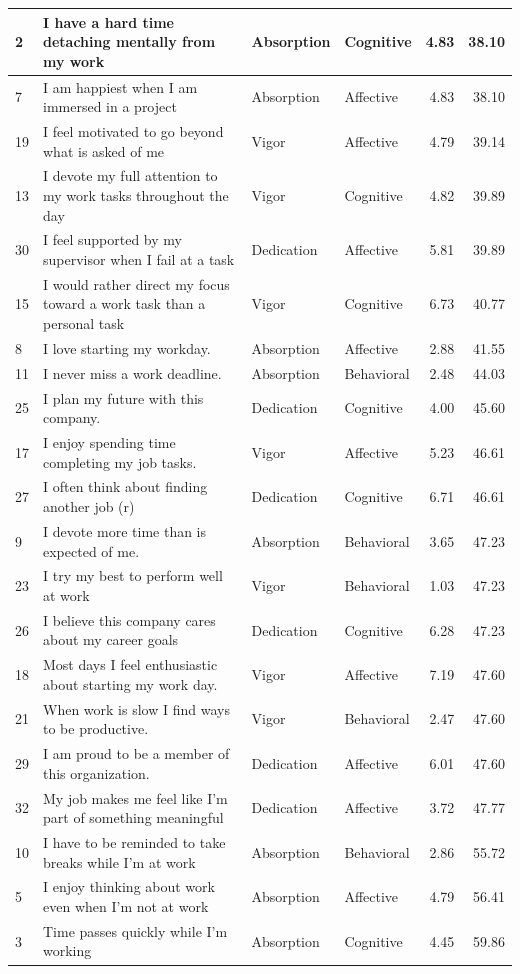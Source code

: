 \documentclass[
]{book}
\begin{document}
\begin{table}
\begin{tabular}[t]{l|l|l|l|r|r}
\hline
2 & I have a hard time detaching mentally from my work & Absorption & Cognitive & 4.83 & 38.10\\
\hline
7 & I am happiest when I am immersed in a project & Absorption & Affective & 4.83 & 38.10\\
\hline
19 & I feel motivated to go beyond what is asked of me & Vigor & Affective & 4.79 & 39.14\\
\hline
13 & I devote my full attention to my work tasks throughout the day & Vigor & Cognitive & 4.82 & 39.89\\
\hline
30 & I feel supported by my supervisor when I fail at a task & Dedication & Affective & 5.81 & 39.89\\
\hline
15 & I would rather direct my focus toward a work task than a personal task & Vigor & Cognitive & 6.73 & 40.77\\
\hline
8 & I love starting my workday. & Absorption & Affective & 2.88 & 41.55\\
\hline
11 & I never miss a work deadline. & Absorption & Behavioral & 2.48 & 44.03\\
\hline
25 & I plan my future with this company. & Dedication & Cognitive & 4.00 & 45.60\\
\hline
17 & I enjoy spending time completing my job tasks. & Vigor & Affective & 5.23 & 46.61\\
\hline
27 & I often think about finding another job (r) & Dedication & Cognitive & 6.71 & 46.61\\
\hline
9 & I devote more time than is expected of me. & Absorption & Behavioral & 3.65 & 47.23\\
\hline
23 & I try my best to perform well at work & Vigor & Behavioral & 1.03 & 47.23\\
\hline
26 & I believe this company cares about my career goals & Dedication & Cognitive & 6.28 & 47.23\\
\hline
18 & Most days I feel enthusiastic about starting my work day. & Vigor & Affective & 7.19 & 47.60\\
\hline
21 & When work is slow I find ways to be productive. & Vigor & Behavioral & 2.47 & 47.60\\
\hline
29 & I am proud to be a member of this organization. & Dedication & Affective & 6.01 & 47.60\\
\hline
32 & My job makes me feel like I’m part of something meaningful & Dedication & Affective & 3.72 & 47.77\\
\hline
10 & I have to be reminded to take breaks while I’m at work & Absorption & Behavioral & 2.86 & 55.72\\
\hline
5 & I enjoy thinking about work even when I’m not at work & Absorption & Affective & 4.79 & 56.41\\
\hline
3 & Time passes quickly while I’m working & Absorption & Cognitive & 4.45 & 59.86\\
\hline
\end{tabular}
\end{table}

  
\end{document}
